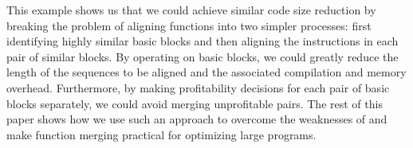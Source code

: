 
This example shows us that we could achieve similar code size reduction by breaking the problem of aligning functions into two simpler processes: first identifying highly similar basic blocks and then aligning the instructions in each pair of similar blocks. 
By operating on basic blocks, we could greatly reduce the length of the sequences to be aligned and the associated compilation and memory overhead. Furthermore, by making profitability decisions for each pair of basic blocks separately, we could avoid merging unprofitable pairs. The rest of this paper shows how we use such an approach to overcome the weaknesses of \SOAName and make function merging practical for optimizing large programs. 






